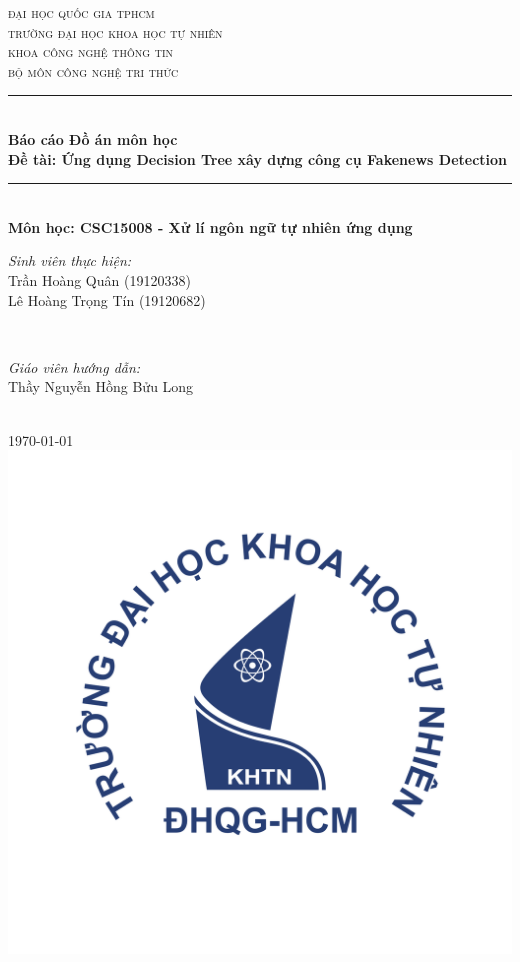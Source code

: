 \documentclass[12pt]{article}
\newcommand{\coursename}{CSC15008 - Xử lí ngôn ngữ tự nhiên ứng dụng}
\newcommand{\reportname}{Ứng dụng Decision Tree xây dựng công cụ Fakenews Detection}
\begin{document}
\begin{titlepage}
\newcommand{\HRule}{\rule{\linewidth}{0.5mm}}
\centering

\textsc{\LARGE đại học quốc gia tphcm}\\[1.5cm]
\textsc{\Large trường đại học khoa học tự nhiên}\\[0.5cm]
\textsc{\large khoa công nghệ thông tin}\\[0.5cm]
\textsc{bộ môn công nghệ tri thức}\\[0.5cm]

\HRule \\[0.4cm]
{
\huge{\bfseries{Báo cáo Đồ án môn học}}\\[0.5cm]
\large{\bfseries{Đề tài: \reportname}}
}\\[0.4cm]
\HRule \\[0.5cm]

\textbf{\large Môn học: \coursename}\\[0.5cm]

\begin{minipage}[t]{0.4\textwidth}
\begin{flushleft} \large
\emph{Sinh viên thực hiện:}\\
Trần Hoàng Quân \textsc{(19120338)}\\
Lê Hoàng Trọng Tín \textsc{(19120682)}
\end{flushleft}
\end{minipage}
~
\begin{minipage}[t]{0.4\textwidth}
\begin{flushright} \large
\emph{Giáo viên hướng dẫn:} \\
Thầy Nguyễn Hồng Bửu Long
\end{flushright}
\end{minipage}\\[2cm]

{\large \today}\\[2cm]

\includegraphics[scale=.25]{img/hcmus-logo.png}\\[1cm]


\end{titlepage}
\end{document}
